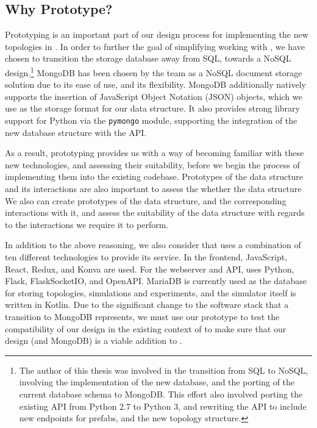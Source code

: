 \documentclass[11pt]{article}
\begin{document}
	\subsection{Why Prototype?}
		Prototyping is an important part of our design process for implementing the new topologies in \opendc{}.
		In order to further the goal of simplifying working with \opendc{}, we have chosen to transition the storage database away from SQL, towards a NoSQL design.\footnote{The author of this thesis was involved in the transition from SQL to NoSQL, involving the implementation of the new database, and the porting of the current database schema to MongoDB. 
		This effort also involved porting the existing \opendc{} API from Python 2.7 to Python 3, and rewriting the API to include new endpoints for prefabs, and the new topology structure.}
		MongoDB has been chosen by the \opendc{} team as a NoSQL document storage solution due to its ease of use, and its flexibility.
		MongoDB additionally natively supports the insertion of JavaScript Object Notation (JSON) objects, which we use as the storage format for our data structure.
		It also provides strong library support for Python via the \verb|pymongo| module, supporting the integration of the new database structure with the \opendc{} API.

		As a result, prototyping provides us with a way of becoming familiar with these new technologies, and assessing their suitability, before we begin the process of implementing them into the existing \opendc{} codebase.
		Prototypes of the data structure and its interactions are also important to assess the whether the data structure 
		We also can create prototypes of the data structure, and the corresponding interactions with it, and assess the suitability of the data structure with regards to the interactions we require it to perform.

		In addition to the above reasoning, we also consider that \opendc{} uses a combination of ten different technologies to provide its service.
		In the frontend, JavaScript, React, Redux, and Konva are used. For the webserver and API, \opendc{} uses Python, Flask, FlaskSocketIO, and OpenAPI.
		MariaDB is currently used as the database for storing topologies, simulations and experiments, and the simulator itself is written in Kotlin.
		Due to the significant change to the software stack that a transition to MongoDB represents, we must use our prototype to test the compatibility of our design in the existing context of \opendc{} to make sure that our design (and MongoDB) is a viable addition to \opendc{}.
\end{document}
